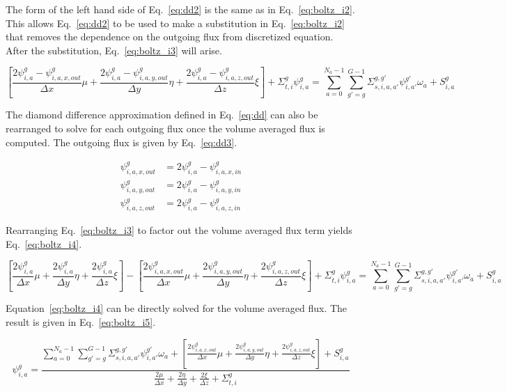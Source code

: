 The form of the left hand side of Eq.~\ref{eq:dd2} is the same as in Eq.~\ref{eq:boltz_i2}. This allows Eq.~\ref{eq:dd2} to be used to make a substitution in Eq.~\ref{eq:boltz_i2} that removes the dependence on the outgoing flux from discretized equation. After the substitution, Eq.~\ref{eq:boltz_i3} will arise.

\begin{equation} \label{eq:boltz_i3}
\left[ 
\frac{2\psi_{i,a}^{g} - \psi_{i,a,x,out}^g}{\Delta x} \mu + 
\frac{2\psi_{i,a}^{g} - \psi_{i,a,y,out}^g}{\Delta y} \eta + 
\frac{2\psi_{i,a}^{g} - \psi_{i,a,z,out}^g}{\Delta z} \xi
\right]
+ \Sigma_{t,i}^g \psi_{i,a}^{g} = 
\sum_{a=0}^{N_a-1} \sum_{g'=g}^{G-1} \Sigma_{s, i, a, a'}^{g, g'} \psi_{i, a'}^{g'} \omega_a + S_{i,a}^g
\end{equation}

The diamond difference approximation defined in Eq.~\ref{eq:dd} can also be rearranged to solve for each outgoing flux once the volume averaged flux is computed. The outgoing flux is given by Eq.~\ref{eq:dd3}.

\begin{equation} \label{eq:dd3}
\begin{split}
\psi_{i,a,x,out}^g &= 2\psi_{i,a}^{g} - \psi_{i,a,x,in}^g \\
\psi_{i,a,y,out}^g &= 2\psi_{i,a}^{g} - \psi_{i,a,y,in}^g \\
\psi_{i,a,z,out}^g &= 2\psi_{i,a}^{g} - \psi_{i,a,z,in}^g
\end{split}
\end{equation}

Rearranging Eq.~\ref{eq:boltz_i3} to factor out the volume averaged flux term yields Eq.~\ref{eq:boltz_i4}.

\begin{equation} \label{eq:boltz_i4}
\left[ 
\frac{2\psi_{i,a}^{g}}{\Delta x} \mu + 
\frac{2\psi_{i,a}^{g}}{\Delta y} \eta + 
\frac{2\psi_{i,a}^{g}}{\Delta z} \xi
\right] - 
\left[ 
\frac{2\psi_{i,a,x,out}^g}{\Delta x} \mu + 
\frac{2\psi_{i,a,y,out}^g}{\Delta y} \eta + 
\frac{2\psi_{i,a,z,out}^g}{\Delta z} \xi
\right]
+ \Sigma_{t,i}^g \psi_{i,a}^{g} = 
\sum_{a=0}^{N_a-1} \sum_{g'=g}^{G-1} \Sigma_{s, i, a, a'}^{g, g'} \psi_{i, a'}^{g'} \omega_a + S_{i,a}^g
\end{equation}

Equation~\ref{eq:boltz_i4} can be directly solved for the volume averaged flux. The result is given in Eq.~\ref{eq:boltz_i5}.

\begin{equation} \label{eq:boltz_i5}
\psi_{i,a}^{g} = 
\frac{
  \sum_{a=0}^{N_a-1} \sum_{g'=g}^{G-1} \Sigma_{s, i, a, a'}^{g, g'} \psi_{i,     a'}^{g'} \omega_a + 
  \left[ 
    \frac{2\psi_{i,a,x,out}^g}{\Delta x} \mu + 
    \frac{2\psi_{i,a,y,out}^g}{\Delta y} \eta + 
    \frac{2\psi_{i,a,z,out}^g}{\Delta z} \xi
  \right] + S_{i,a}^g
}{
  \frac{2\mu}{\Delta x}  + 
  \frac{2\eta}{\Delta y} + 
  \frac{2\xi}{\Delta z} + 
  \Sigma_{t,i}^g
}
\end{equation}

